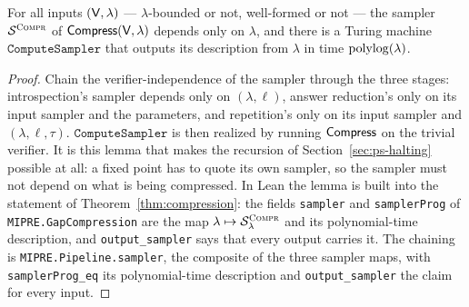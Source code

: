 \begin{lemma}
\label{lem:compress-sampler-indep}
\leanok
For all inputs $(\mathsf{V}, \lambda)$ --- $\lambda$-bounded or not, well-formed or not
--- the sampler $\mathcal{S}^{\textsc{Compr}}$ of $\mathsf{Compress}(\mathsf{V}, \lambda)$ depends only on $\lambda$,
and there is a Turing machine $\mathtt{ComputeSampler}$ that outputs its description from
$\lambda$ in time $\mathrm{polylog}(\lambda)$.
\end{lemma}
\begin{proof}
\leanok
Chain the verifier-independence of the sampler through the three stages: introspection's
sampler depends only on $(\lambda, \ell)$, answer reduction's only on its input sampler
and the parameters, and repetition's only on its input sampler and $(\lambda, \ell,
\tau)$. $\mathtt{ComputeSampler}$ is then realized by running $\mathsf{Compress}$ on the trivial
verifier. It is this lemma that makes the recursion of Section~\ref{sec:ps-halting}
possible at all: a fixed point has to quote its own sampler, so the sampler must not
depend on what is being compressed. In Lean the lemma is built into the statement of
Theorem~\ref{thm:compression}: the fields \texttt{sampler} and \texttt{samplerProg} of
\texttt{MIPRE.GapCompression} are the map $\lambda \mapsto \mathcal{S}^{\textsc{Compr}}_\lambda$ and its
polynomial-time description, and \texttt{output\_sampler} says that every output carries it.
The chaining is \texttt{MIPRE.Pipeline.sampler}, the composite of the three sampler maps, with
\texttt{samplerProg\_eq} its polynomial-time description and \texttt{output\_sampler} the
claim for every input.
\end{proof}

\effortMedium

